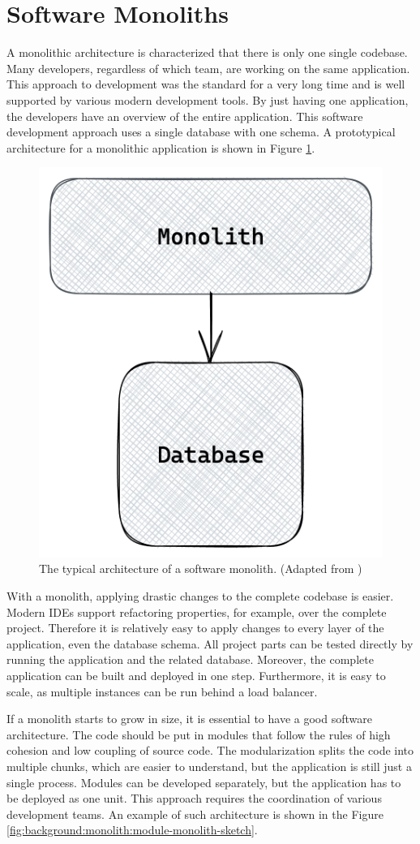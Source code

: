 \section{Software Monoliths}\label{section:background:software-monolith}

A monolithic architecture is characterized that there is only one single codebase. Many developers, regardless of which team, are working on the same application. This approach to development was the standard for a very long time and is well supported by various modern development tools. By just having one application, the developers have an overview of the entire application. This software development approach uses a single database with one schema. A prototypical architecture for a monolithic application is shown in Figure \ref{fig:background:monolith:monolith-sketch}.

\ifshowImages
\begin{figure}[H]
  \centering
  \includegraphics[width=0.3\linewidth]{images/background/monolith/monolith-sketch.png}
  \caption{The typical architecture of a software monolith. (Adapted from \cite[12]{book:2019:newman:background:monolith:monolith-to-microservices})}\label{fig:background:monolith:monolith-sketch}
\end{figure}
\fi

\bigskip

\noindent With a monolith, applying drastic changes to the complete codebase is easier. Modern \acp{IDE} support refactoring properties, for example, over the complete project. Therefore it is relatively easy to apply changes to every layer of the application, even the database schema. All project parts can be tested directly by running the application and the related database. Moreover, the complete application can be built and deployed in one step. Furthermore, it is easy to scale, as multiple instances can be run behind a load balancer. \cite[4]{book:2018:richardson:background:bff:microservices-patterns}

\bigskip

\noindent If a monolith starts to grow in size, it is essential to have a good software architecture. The code should be put in modules that follow the rules of high cohesion and low coupling of source code. The modularization splits the code into multiple chunks, which are easier to understand, but the application is still just a single process. Modules can be developed separately, but the application has to be deployed as one unit. This approach requires the coordination of various development teams. \cite[12-13]{book:2018:richardson:background:bff:microservices-patterns} \cite[12-13]{book:2019:newman:background:monolith:monolith-to-microservices} An example of such architecture is shown in the Figure \ref{fig:background:monolith:module-monolith-sketch}.


